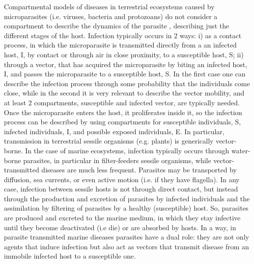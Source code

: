 Compartmental models of diseases in terrestrial ecosystems caused by
microparasites (i.e. viruses, bacteria
and protozoans) do not consider a compartment to describe the
dynamics of the parasite \cite{May1979}, describing  just the different
stages of the host. Infection typically occurs in $2$ ways: i) as a contact
process, in which the microparasite is transmitted directly from a an infected
host, I, by contact or through air in close proximity, to a susceptible host,
S; ii) through a vector, that has acquired the microparasite by biting an
infected host, I, and passes the microparasite to a susceptible host, S. In the
first case one can describe the infection process through some probability that
the individuals come close, while in the second it is very relevant to
describe the vector mobility, and at least $2$ compartments, susceptible
and infected vector, are typically needed.
Once the microparasite enters the host, it proliferates inside it,
so the infection process can be described by using compartments for
susceptible individuals, S,
infected individuals, I, and possible exposed individuals, E.
In particular, transmission in terrestrial sessile organisms (e.g. plants)
is generically vector-borne.
In the case of marine ecosystems, infection typically occurs through
water-borne parasites,
in particular in filter-feeders sessile organisms, while vector-transmitted
diseases
are much less frequent. Parasites may be transported by diffusion, sea
currents, or even active motion (i.e. if they have flagella). In any case,
infection between sessile hosts is not through direct contact, but instead
through the production and excretion of parasites by infected individuals and
the assimilation by filtering of parasites by a healthy (susceptible) host. So,
parasites are produced and excreted to the marine medium, in which they stay
infective until they become deactivated (i.e die) or are absorbed by hosts. In
a way, in parasite transmitted marine diseases parasites have a dual role: they
are not only agents that induce infection
but also act as vectors that transmit disease from an immobile infected
host to a susceptible one.

